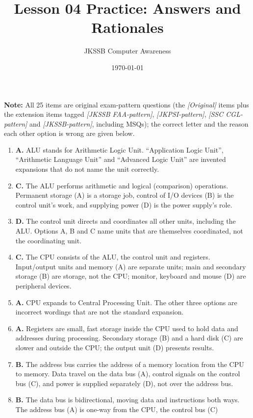 \documentclass[11pt]{article}
\title{Lesson 04 Practice: Answers and Rationales}
\author{JKSSB Computer Awareness}
\date{\today}
\begin{document}
\maketitle
\noindent\textbf{Note:} All 25 items are original exam-pattern questions (the \textit{[Original]} items plus the extension items tagged \textit{[JKSSB FAA-pattern]}, \textit{[JKPSI-pattern]}, \textit{[SSC CGL-pattern]} and \textit{[JKSSB-pattern]}, including MSQs); the correct letter and the reason each other option is wrong are given below.


\begin{enumerate}[label=\textbf{Q\arabic*.}, leftmargin=*]
\item \textbf{A.} ALU stands for Arithmetic Logic Unit. ``Application Logic
  Unit'', ``Arithmetic Language Unit'' and ``Advanced Logic Unit'' are
  invented expansions that do not name the unit correctly.
\item \textbf{C.} The ALU performs arithmetic and logical (comparison)
  operations. Permanent storage (A) is a storage job, control of I/O devices
  (B) is the control unit's work, and supplying power (D) is the power
  supply's role.
\item \textbf{D.} The control unit directs and coordinates all other units,
  including the ALU. Options A, B and C name units that are themselves
  coordinated, not the coordinating unit.
\item \textbf{C.} The CPU consists of the ALU, the control unit and registers.
  Input/output units and memory (A) are separate units; main and secondary
  storage (B) are storage, not the CPU; monitor, keyboard and mouse (D) are
  peripheral devices.
\item \textbf{A.} CPU expands to Central Processing Unit. The other three
  options are incorrect wordings that are not the standard expansion.
\item \textbf{A.} Registers are small, fast storage inside the CPU used to
  hold data and addresses during processing. Secondary storage (B) and a hard
  disk (C) are slower and outside the CPU; the output unit (D) presents
  results.
\item \textbf{B.} The address bus carries the address of a memory location
  from the CPU to memory. Data travel on the data bus (A), control signals on
  the control bus (C), and power is supplied separately (D), not over the
  address bus.
\item \textbf{B.} The data bus is bidirectional, moving data and instructions
  both ways. The address bus (A) is one-way from the CPU, the control bus (C)

\end{enumerate}
\end{document}
